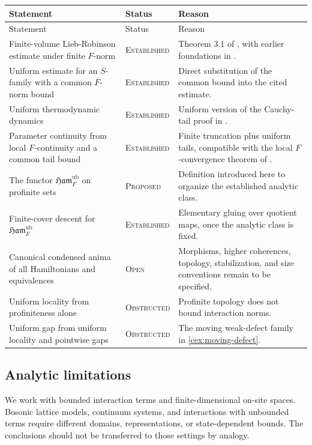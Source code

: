 \documentclass[12pt]{article}
\theoremstyle{definition}
\theoremstyle{remark}
\newcommand{\Ham}{\mathfrak{Ham}}
\newcommand{\EST}{\textsc{Established}}
\newcommand{\PROP}{\textsc{Proposed}}
\newcommand{\OBS}{\textsc{Obstructed}}
\newcommand{\OPEN}{\textsc{Open}}
\begin{document}
\begin{longtable}{>{\raggedright\arraybackslash}p{}
                  >{\raggedright\arraybackslash}p{}
                  >{\raggedright\arraybackslash}p{}}
\toprule
Statement & Status & Reason \\
\midrule
\endfirsthead
\toprule
Statement & Status & Reason \\
\midrule
\endhead
Finite-volume Lieb-Robinson estimate under finite $F$-norm
& \EST{}
& Theorem 3.1 of \cite{NSY2019}, with earlier foundations in
\cite{NachtergaeleSims2010}. \\
Uniform estimate for an $S$-family with a common $F$-norm bound
& \EST{}
& Direct substitution of the common bound into the cited estimate. \\
Uniform thermodynamic dynamics
& \EST{}
& Uniform version of the Cauchy-tail proof in \cite{NSY2019}. \\
Parameter continuity from local $F$-continuity and a common tail bound
& \EST{}
& Finite truncation plus uniform tails, compatible with the local
$F$-convergence theorem of \cite{NSY2019}. \\
The functor $\Ham_F^{\mathrm{ub}}$ on profinite sets
& \PROP{}
& Definition introduced here to organize the established analytic class. \\
Finite-cover descent for $\Ham_F^{\mathrm{ub}}$
& \EST{}
& Elementary gluing over quotient maps, once the analytic class is fixed. \\
Canonical condensed anima of all Hamiltonians and equivalences
& \OPEN{}
& Morphisms, higher coherences, topology, stabilization, and size
conventions remain to be specified. \\
Uniform locality from profiniteness alone
& \OBS{}
& Profinite topology does not bound interaction norms. \\
Uniform gap from uniform locality and pointwise gaps
& \OBS{}
& The moving weak-defect family in \cref{cex:moving-defect}. \\
\bottomrule
\end{longtable}

\subsection{Analytic limitations}

We work with bounded interaction terms and finite-dimensional on-site spaces.
Bosonic lattice models, continuum systems, and interactions with unbounded
terms require different domains, representations, or state-dependent bounds.
The conclusions should not be transferred to those settings by analogy.
\end{document}
